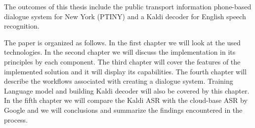 The outcomes of this thesis include the public transport information phone-based dialogue system for New York (PTINY) and a Kaldi decoder for English speech recognition.

The paper is organized as follows.
In the first chapter we will look at the used technologies.
In the second chapter we will discuss the implementation in its principles by each component. %
The third chapter will cover the features of the implemented solution and it will display its capabilities.
The fourth chapter will describe the workflows associated with creating a dialogue system.
Training Language model and building Kaldi decoder will also be covered by this chapter.
In the fifth chapter we will compare the Kaldi ASR with the cloud-base ASR by Google and we will conclusions and summarize the findings encountered in the process.
















